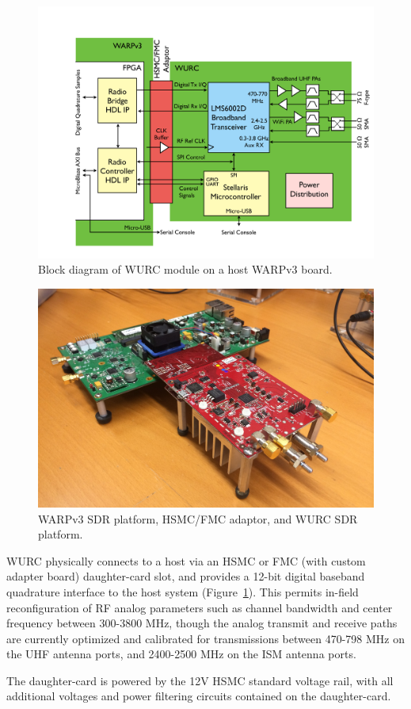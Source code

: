 \begin{figure}[p]
\centering
  \includegraphics[width=0.7\linewidth]{figs/wurc/WARP_WURC}   
    \caption{Block diagram of WURC module on a host WARPv3 board.}
\label{fig_wurc_block_diagram}
\end{figure}

\begin{figure}[p]
\centering
  \includegraphics[width=0.7\linewidth]{figs/wurc/wurc_platform_rev_a_warp}   
    \caption{WARPv3 SDR platform, HSMC/FMC adaptor, and WURC SDR platform.}
\label{fig_warp_wurc_hw}
\end{figure}

	\ac{WURC} physically connects to a host via an HSMC or FMC (with custom adapter board) daughter-card slot, and provides a 12-bit digital baseband quadrature interface to the host system (Figure~\ref{fig_wurc_block_diagram}).
	This permits in-field reconfiguration of RF analog parameters such as channel bandwidth and center frequency between 300-3800 MHz, though the analog transmit and receive paths are currently optimized and calibrated for transmissions between 470-798 MHz on the UHF antenna ports, and 2400-2500 MHz on the ISM antenna ports.

	The daughter-card is powered by the 12V HSMC standard voltage rail, with all additional voltages and power filtering circuits contained on the daughter-card.

